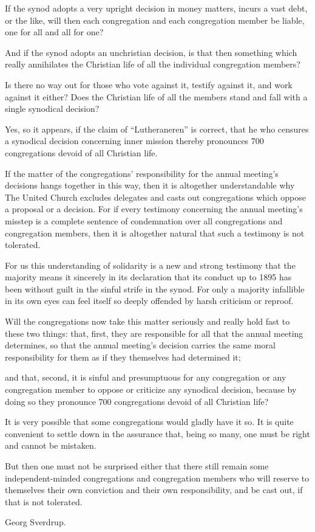 If the synod adopts a very upright decision in money matters, incurs a vast debt, or the like, will then each congregation and each congregation member be liable, one for all and all for one?

And if the synod adopts an unchristian decision, is that then something which really annihilates the Christian life of all the individual congregation members?

Is there no way out for those who vote against it, testify against it, and work against it either?
Does the Christian life of all the members stand and fall with a single synodical decision?

Yes, so it appears, if the claim of “Lutheraneren” is correct, that he who censures a synodical decision concerning inner mission thereby pronounces 700 congregations devoid of all Christian life.

If the matter of the congregations’ responsibility for the annual meeting’s decisions hangs together in this way, then it is altogether understandable why The United Church excludes delegates and casts out congregations which oppose a proposal or a decision. For if every testimony concerning the annual meeting’s misstep is a complete sentence of condemnation over all congregations and congregation members, then it is altogether natural that such a testimony is not tolerated.

For us this understanding of solidarity is a new and strong testimony that the majority means it sincerely in its declaration that its conduct up to 1895 has been without guilt in the sinful strife in the synod. For only a majority infallible in its own eyes can feel itself so deeply offended by harsh criticism or reproof.

Will the congregations now take this matter seriously and really hold fast to these two things: that, first, they are responsible for all that the annual meeting determines, so that the annual meeting’s decision carries the same moral responsibility for them as if they themselves had determined it;

and that, second, it is sinful and presumptuous for any congregation or any congregation member to oppose or criticize any synodical decision, because by doing so they pronounce 700 congregations devoid of all Christian life?

It is very possible that some congregations would gladly have it so. It is quite convenient to settle down in the assurance that, being so many, one must be right and cannot be mistaken.

But then one must not be surprised either that there still remain some independent-minded congregations and congregation members who will reserve to themselves their own conviction and their own responsibility, and be cast out, if that is not tolerated.

Georg Sverdrup.
